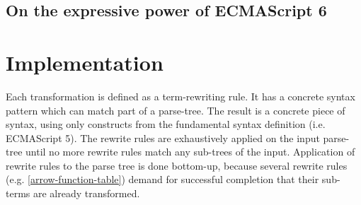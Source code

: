 \subsection{On the expressive power of ECMAScript 6}

\section{Implementation}
Each transformation is defined as a term-rewriting rule. It has a concrete syntax pattern which can match part of a parse-tree. The result is a concrete piece of syntax, using only constructs from the fundamental syntax definition (i.e. ECMAScript 5).
The rewrite rules are exhaustively applied on the input parse-tree until no more rewrite rules match any sub-trees of the input. Application of rewrite rules to the parse tree is done bottom-up, because several rewrite rules (e.g. \ref{arrow-function-table}) demand for successful completion that their sub-terms are already transformed.
